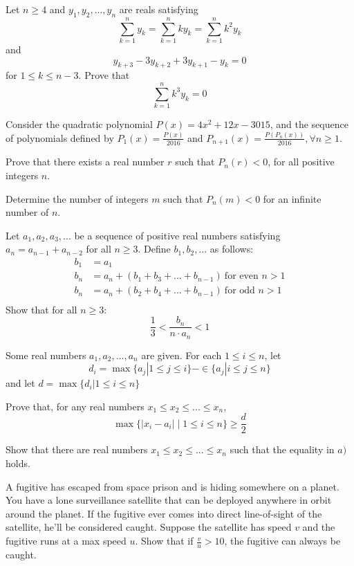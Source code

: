 
 {Let $n\ge 4$ and $y_1,y_2,...,y_n$ are reals satisfying $$\sum_{k=1}^n y_k=\sum_{k=1}^n ky_k = \sum_{k=1}^n k^2y_k$$ and $$y_{k+3}-3y_{k+2}+3y_{k+1}-y_k=0$$ for $1\le k\le n-3$. Prove that $$\sum_{k=1}^n k^3y_k=0$$}

 {Consider the quadratic polynomial $P(x) = 4x^2 + 12x - 3015$, and the sequence of polynomials defined by $P_1(x) = \frac{P(x)}{2016}$ and $P_{n+1}(x) = \frac{P(P_n(x))}{2016}, \forall n \ge 1$.
\bi
    \item[a)] Prove that there exists a real number $r$ such that $P_n(r) < 0$, for all positive integers $n$.
    \item[b)] Determine the number of integers $m$ such that $P_n(m) < 0$ for an infinite number of $n$.
\ei}

 {Let $a_1,a_2,a_3,...$ be a sequence of positive real numbers satisfying $a_n=a_{n-1}+a_{n-2}$ for all $n\ge 3$. Define $b_1,b_2,...$ as follows:
    \begin{align*}
    b_1 &= a_1\\
    b_n &= a_n + (b_1+b_3+...+b_{n-1})\ \text{for even }n>1\\
    b_n &= a_n + (b_2+b_4+...+b_{n-1})\ \text{for odd }n>1\\
    \end{align*}
    Show that for all $n\ge 3$: 
    $$\frac{1}{3}<\frac{b_n}{n\cdot a_n}<1$$}



 {Some real numbers $a_1, a_2,..., a_n$ are given. For each $1 \le i \le n$, let
\[d_i = \max\{a_j | 1 \le j \le i \} - \in\{a_j | i \le j \le n \}\]
and let $d = \max\{d_i | 1 \le i \le n \}$
\bi
    \item[a)] Prove that, for any real numbers $x_1 \le x_2 \le ... \le x_n$,
    \[\max\{|x_i-a_i|\mid1\le i \le n\} \ge \frac d2\]
    \item[b)] Show that there are real numbers $x_1 \le x_2 \le ... \le x_n$ such that the equality in $a)$ holds.
\ei}



 {A fugitive has escaped from space prison and is hiding somewhere on a planet. You have a lone surveillance satellite that can be deployed anywhere in orbit around the planet. If the fugitive ever comes into direct line-of-sight of the satellite, he'll be considered caught. Suppose the satellite has speed $v$ and the fugitive runs at a max speed $u$. Show that if $\frac vu > 10$, the fugitive can always be caught.}

